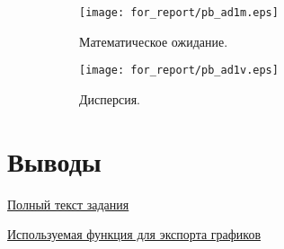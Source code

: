 \documentclass[12pt,a4paper]{article}
\begin{document}
\begin{figure}[p]
  \centering
  \begin{subfigure}[b]{0.48\textwidth}
    \centering
    \texttt{[image: for\_report/pb\_ad1m.eps]}
    \label{fig:pb_ad1m}
    \caption{Математическое ожидание.}
  \end{subfigure}
  \begin{subfigure}[b]{0.48\textwidth}
    \centering
    \texttt{[image: for\_report/pb\_ad1v.eps]}
    \label{fig:pb_ad1v}
    \caption{Дисперсия.}
  \end{subfigure}
  \label{fig:pb_ad1mv}
  \caption{}
\end{figure}

\section{Выводы}

\begin{thebibliography}{0}

  \href{http://www.machinelearning.ru/wiki/index.php?title=%D0%93%D1%80%D0%B0%D1%84%D0%B8%D1%87%D0%B5%D1%81%D0%BA%D0%B8%D0%B5_%D0%BC%D0%BE%D0%B4%D0%B5%D0%BB%D0%B8_%28%D0%BA%D1%83%D1%80%D1%81_%D0%BB%D0%B5%D0%BA%D1%86%D0%B8%D0%B9%29/2014/%D0%97%D0%B0%D0%B4%D0%B0%D0%BD%D0%B8%D0%B5_1}{Полный текст задания}

  \href{https://www.google.ru/url?sa=t&rct=j&q=&esrc=s&source=web&cd=1&ved=0CCkQFjAA&url=http%3A%2F%2Fwww.mathworks.com%2Fmatlabcentral%2Ffileexchange%2F23629-exportfig&ei=B4wNU-eHJYva4QS0wYGQAw&usg=AFQjCNEhL-HxuJ6pWzFD4LyUVngfW8fFFw&sig2=Ap03ODZFTZ3aY95uWxcTow&cad=rja}{Используемая функция для экспорта графиков}

\end{thebibliography}
\end{document}
